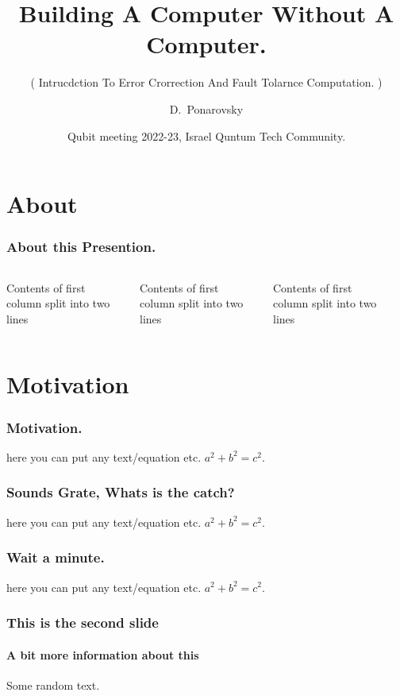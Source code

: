 \documentclass{beamer}
\title[Crisis] %
{Building A Computer Without A Computer.}
\subtitle{ ( Intrucdction To Error Crorrection And Fault Tolarnce Computation. ) }
\author[D.~Ponarovsky] %
	{D.~Ponarovsky\inst{1}}
\institute[Hebrew University of Jerusalem] %
	{ \inst{1} Faculty of Computer Science\newline
	  Hebrew University of Jerusalem
	}
\date[2022-23] %
{Qubit meeting 2022-23, Israel Quntum Tech Community.}
\begin{document}
     \maketitle
     \section{About}
	\begin{frame}
	  \frametitle{ About this Presention.  }
	   \begin{columns}[T] %
     \begin{column}{.23\textwidth} %
     Contents of first column \newline split into two lines
     \end{column}
     \begin{column}{.23\textwidth} %
     Contents of first column \newline split into two lines
     \end{column}
     \begin{column}{.23\textwidth} %
     Contents of first column \newline split into two lines
     \end{column}
     \begin{column}{.23\textwidth} %
     \end{column}
     \end{columns}
	\end{frame}
	\section{Motivation}
	\begin{frame}
	  \frametitle{ Motivation. }
		here you can put any text/equation etc. 
		$a^2 + b^2 = c^2$.		
	\end{frame}\begin{frame}
	  \frametitle{ Sounds Grate, Whats is the catch? }
		here you can put any text/equation etc. 
		$a^2 + b^2 = c^2$.		
	\end{frame}\begin{frame}
	  \frametitle{ Wait a minute. }
		here you can put any text/equation etc. 
		$a^2 + b^2 = c^2$.		
	\end{frame}
	\begin{frame}
		\frametitle{This is the second slide}
		\framesubtitle{A bit more information about this}
		Some random text.		
	\end{frame}
\end{document}
